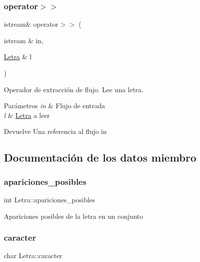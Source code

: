 \subsubsection{\texorpdfstring{operator$>$$>$}{operator>>}}
{\footnotesize\ttfamily istream\& operator$>$$>$ (\begin{DoxyParamCaption}\item[{istream \&}]{in,  }\item[{\hyperlink{classLetra}{Letra} \&}]{l }\end{DoxyParamCaption})\hspace{0.3cm}{\ttfamily [friend]}}



Operador de extracción de flujo. Lee una letra. 


\begin{DoxyParams}{Parámetros}
{\em in} & Flujo de entrada \\
\hline
{\em l} & \hyperlink{classLetra}{Letra} a leer \\
\hline
\end{DoxyParams}
\begin{DoxyReturn}{Devuelve}
Una referencia al flujo in 
\end{DoxyReturn}


\subsection{Documentación de los datos miembro}
\mbox{\label{classLetra_a2aa1db254581132a0846e132ab369104}} 
\subsubsection{\texorpdfstring{apariciones\+\_\+posibles}{apariciones\_posibles}}
{\footnotesize\ttfamily int Letra\+::apariciones\+\_\+posibles\hspace{0.3cm}{\ttfamily [private]}}

Apariciones posibles de la letra en un conjunto \mbox{\label{classLetra_ac279abbe29274f9de8e8a51b1f8c1f50}} 
\subsubsection{\texorpdfstring{caracter}{caracter}}
{\footnotesize\ttfamily char Letra\+::caracter\hspace{0.3cm}{\ttfamily [private]}}

